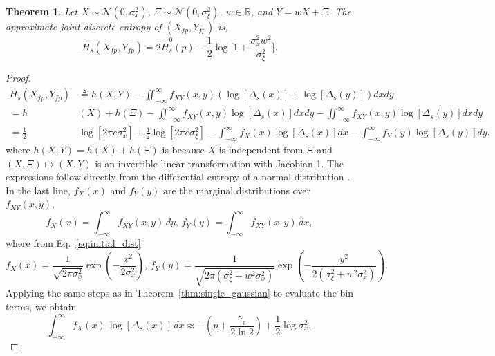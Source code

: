 \documentclass[12pt,onecolumn, margin=1in]{IEEEtran}
\newtheorem{theorem}{Theorem}[section]
\newcommand{\bracket}[1]{\left[ #1 \right]}
\newcommand{\Ht}{\tilde{H}}
\newcommand{\Xfp}{X_{fp}}
\newcommand{\Yfp}{Y_{fp}}
\begin{document}
\begin{theorem}
    \label{thm:double_gaussian}
    Let $X \sim \mathcal{N}(0,\sigma_x^2)$, $\Xi \sim \mathcal{N}(0,\sigma_\xi^2)$, $w \in \mathbb{R}$, and $Y = wX + \Xi$. The approximate joint discrete entropy of $(\Xfp, \Yfp)$ is,
\begin{equation*}
    \Ht_s(\Xfp, \Yfp) = 2 \Ht^0_s(p)-\frac{1}{2} \log \bigg [ 1+\frac{\sigma_x^2 w^2}{\sigma_\xi^2} \bigg].
\end{equation*}
\end{theorem}
\begin{proof}
\begin{equation}
\label{eq:approx_joint_ent_SNR_start}
    \begin{aligned}
        \Ht_s(\Xfp, \Yfp) &\triangleq h(X, Y) - \iint_{-\infty}^\infty f_{XY}(x,y) ( \log[\Delta_s(x)] + \log[\Delta_s(y)])dxdy \\
        = h& (X)  + h(\Xi) - \iint_{-\infty}^\infty f_{XY}(x,y)  \log[\Delta_s(x)] dxdy - \iint_{-\infty}^\infty f_{XY}(x,y)\log[\Delta_s(y)]dxdy \\
        = \frac{1}{2}&\log[2\pi e \sigma_x^2] + \frac{1}{2}\log[2\pi e \sigma_\xi^2] - \int_{-\infty}^\infty f_{X}(x)  \log[\Delta_s(x)] dx - \int_{-\infty}^\infty f_{Y}(y)\log[\Delta_s(y)]dy.
    \end{aligned}
\end{equation}
where $h(X,Y) = h(X) + h(\Xi)$ is because $X$ is independent from $\Xi$ and $(X,\Xi) \mapsto (X,Y)$ is an invertible linear transformation with Jacobian 1. The expressions follow directly from the differential entropy of a normal distribution \cite{CoverThomas}. In the last line, $f_X(x)$ and $f_Y(y)$ are the marginal distributions over $f_{XY}(x,y)$,
\begin{equation}
    f_X(x) = \int_{-\infty}^\infty f_{XY}(x,y) \, dy\text{,  }f_Y(y) = \int_{-\infty}^\infty f_{XY}(x,y) \, dx,
\end{equation}
where from Eq.~\eqref{eq:initial_dist}
\begin{equation}
    f_X(x) =
\frac{1}{\sqrt{2\pi\sigma_x^2}}
\exp\left(-\frac{x^2}{2\sigma_x^2}\right)\text{,  } f_Y(y) =
\frac{1}{\sqrt{2\pi(\sigma_\xi^2+w^2\sigma_x^2)}}
\exp\left(-\frac{y^2}{2(\sigma_\xi^2+w^2\sigma_x^2)}\right).
\end{equation}
Applying the same steps as in Theorem~\ref{thm:single_gaussian} to evaluate the bin terms, we obtain
\begin{equation}
    \int_{-\infty}^{\infty} f_X(x)\,\log\bracket{\Delta_s(x)}\,dx
\approx
-\left(p+\frac{\gamma_e}{2\ln 2}\right)
+\frac{1}{2}\log \sigma_x^2,
\end{equation}


\end{proof}
\end{document}
